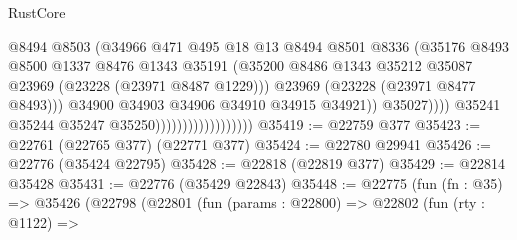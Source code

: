\begin{lexlean}{RustCore}
\begin{coremodule}
                                                  @8494
                                                  @8503
                                                  (@34966
                                                    @471
                                                    @495
                                                    @18
                                                    @13
                                                    @8494
                                                    @8501
                                                    @8336
                                                    (@35176
                                                      @8493
                                                      @8500
                                                      @1337
                                                      @8476
                                                      @1343
                                                      @35191
                                                      (@35200
                                                        @8486
                                                        @1343
                                                        @35212
                                                        @35087
                                                        @23969
                                                        (@23228 (@23971 @8487 @1229)))
                                                      @23969
                                                      (@23228 (@23971 @8477 @8493)))
                                                    @34900
                                                    @34903
                                                    @34906
                                                    @34910
                                                    @34915
                                                    @34921))
                                                @35027))))
                                        @35241
                                        @35244
                                        @35247
                                        @35250))))))))))))))))))
@35419 := @22759 @377
@35423 := @22761 (@22765 @377) (@22771 @377)
@35424 := @22780 @29941
@35426 := @22776 (@35424 @22795)
@35428 := @22818 (@22819 @377)
@35429 := @22814 @35428
@35431 := @22776 (@35429 @22843)
@35448 := @22775
    (fun (fn : @35) =>
    @35426
      (@22798
        (@22801
          (fun (params : @22800) =>
          @22802
            (fun (rty : @1122) =>

\end{coremodule}
\end{lexlean}
